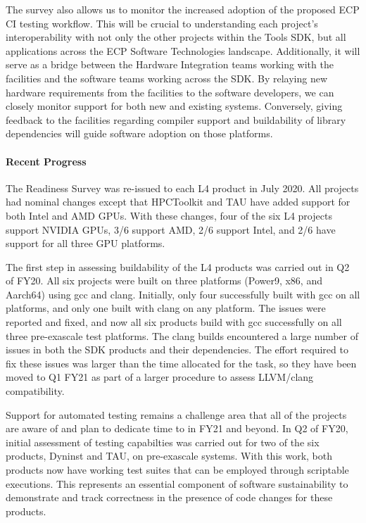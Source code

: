 The survey also allows us to monitor the increased adoption of the proposed ECP CI testing workflow. This will be crucial to understanding each project’s interoperability with not only the other projects within the Tools SDK, but all applications across the ECP Software Technologies landscape. Additionally, it will serve as a bridge between the Hardware Integration teams working with the facilities and the software teams working across the SDK. By relaying new hardware requirements from the facilities to the software developers, we can closely monitor support for both new and existing systems. Conversely, giving feedback to the facilities regarding compiler support and buildability of library dependencies will guide software adoption on those platforms.

\paragraph{Recent Progress}
The Readiness Survey was re-issued to each L4 product in July 2020. All projects had nominal changes except that HPCToolkit and TAU have added support for both Intel and AMD GPUs. With these changes,  four of the six L4 projects support NVIDIA GPUs, 3/6 support AMD, 2/6 support Intel, and 2/6 have support for all three GPU platforms.

The first step in assessing buildability of the L4 products was carried out in Q2 of FY20. All six projects were built on three platforms (Power9, x86, and Aarch64) using gcc and clang. Initially, only four successfully built with gcc on all platforms, and only one built with clang on any platform. The issues were reported and fixed, and now all six products build with gcc successfully on all three pre-exascale test platforms. The clang builds encountered a large number of issues in both the SDK products and their dependencies. The effort required to fix these issues was larger than the time allocated for the task, so they have been moved to Q1 FY21 as part of a larger procedure to assess LLVM/clang compatibility.

Support for automated testing remains a challenge area that all of the projects are aware of and plan to dedicate time to in FY21 and beyond. In Q2 of FY20, initial assessment of testing capabilties was carried out for two of the six products, Dyninst and TAU, on pre-exascale systems. With this work, both products now have working test suites that can be employed through scriptable executions. This represents an essential component of software sustainability to demonstrate and track correctness in the presence of code changes for these products.

